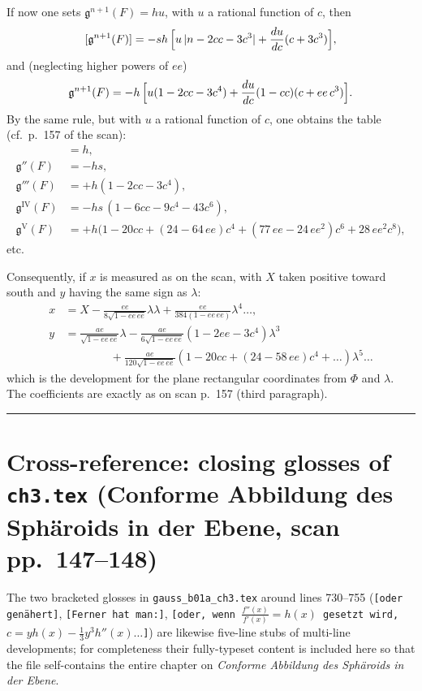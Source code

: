 \documentclass[12pt,a4paper]{article}
\begin{document}
If now one sets $\mathfrak{g}^{n+1}(F) = h u$, with $u$ a rational
function of $c$, then
\[
   [\mathfrak{g}^{n+1}(F)] = -sh\,\Bigl[u\,|n-2cc-3c^{3}|
       + \frac{du}{dc}(c+3c^{3})\Bigr],
\]
and (neglecting higher powers of $ee$)
\[
   \mathfrak{g}^{n+1}(F)
     = -h\,\Bigl[u(1-2cc-3c^{4})
                 + \frac{du}{dc}(1-cc)(c+ee\,c^{3})\Bigr].
\]
By the same rule, but with $u$ a rational function of $c$, one obtains
the table (cf.\ p.~157 of the scan):
\begin{align*}
   [\mathfrak{g}'(F)] &= h,\\
   \mathfrak{g}''(F) &= -hs,\\
   \mathfrak{g}'''(F) &= +h(1-2cc-3c^{4}),\\
   \mathfrak{g}^{\mathrm{IV}}(F) &= -hs\,(1-6cc-9c^{4}-43c^{6}),\\
   \mathfrak{g}^{\mathrm{V}}(F) &= +h\bigl(1-20cc+(24-64\,ee)c^{4}
                              +(77\,ee-24\,ee^{2})c^{6}+28\,ee^{2}c^{8}\bigr),
\end{align*}
etc.

Consequently, if $x$ is measured as on the scan, with $X$ taken
positive toward south and $y$ having the same sign as $\lambda$:
\begin{align*}
   x &= X - \frac{ee}{8\sqrt{1-ee\,ee}}\lambda\lambda
        + \frac{ee}{384(1-ee\,ee)}\lambda^{4}\ldots,\\[3pt]
   y &= \frac{ae}{\sqrt{1-ee\,ee}}\lambda
       - \frac{ae}{6\sqrt{1-ee\,ee}}(1-2ee-3c^{4})\lambda^{3}\\
     &\qquad\qquad + \frac{ae}{120\sqrt{1-ee\,ee}}(1-20cc+(24-58\,ee)c^{4}+\ldots)\lambda^{5}\ldots
\end{align*}
which is the development for the plane rectangular coordinates from
$\Phi$ and $\lambda$. The coefficients are exactly as on scan
p.~157 (third paragraph).

\bigskip
\hrule
\bigskip

\section*{Cross-reference: closing glosses of \texttt{ch3.tex} (Conforme Abbildung des Sph\"aroids in der Ebene, scan pp.~147--148)}

The two bracketed glosses in \texttt{gauss\_b01a\_ch3.tex} around
lines 730--755 (\texttt{[oder gen\"ahert]}, \texttt{[Ferner hat man:]},
\texttt{[oder, wenn $\frac{f''(x)}{f'(x)}=h(x)$ gesetzt wird,
$c = yh(x)-\tfrac13 y^{3}h''(x)\ldots$]}) are likewise five-line
stubs of multi-line developments; for completeness their
fully-typeset content is included here so that the file
self-contains the entire chapter on \emph{Conforme Abbildung des
Sph\"aroids in der Ebene}.
\end{document}
